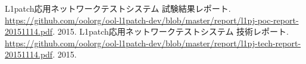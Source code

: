 
\begin{thebibliography}{99}
         L1patch応用ネットワークテストシステム 試験結果レポート.
         \url{https://github.com/oolorg/ool-l1patch-dev/blob/master/report/l1pj-poc-report-20151114.pdf}.
         2015.
         L1patch応用ネットワークテストシステム 技術レポート.
         \url{https://github.com/oolorg/ool-l1patch-dev/blob/master/report/l1pj-tech-report-20151114.pdf}.
         2015.
\end{thebibliography}

